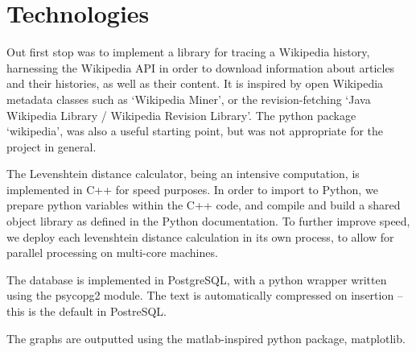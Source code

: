 \section{Technologies}
Out first stop was to implement a library for tracing a Wikipedia
history, harnessing the Wikipedia API in order to download information
about articles and their histories, as well as their content. It is
inspired by open Wikipedia metadata classes such as `Wikipedia
Miner'\cite{wiki-miner}, or the revision-fetching `Java Wikipedia
Library / Wikipedia Revision
Library'.\cite{wiki-java}\cite{Ferschke2011} The python package
`wikipedia',\cite{python-wikipedia} was also a useful starting point,
but was not appropriate for the project in general.

The Levenshtein distance calculator, being an intensive computation,
is implemented in C++ for speed purposes. In order to import to
Python, we prepare python variables within the C++ code, and compile
and build a shared object library as defined in the Python
documentation.\cite{python-extend-c++} To further improve speed, we
deploy each levenshtein distance calculation in its own process, to
allow for parallel processing on multi-core machines.

The database is implemented in PostgreSQL, with a python wrapper
written using the psycopg2 module.\cite{psycopg2} The text is
automatically compressed on insertion -- this is the default in
PostreSQL.\cite{psql-comp} 

The graphs are outputted using the matlab-inspired python package,
matplotlib.\cite{matplotlib} 
